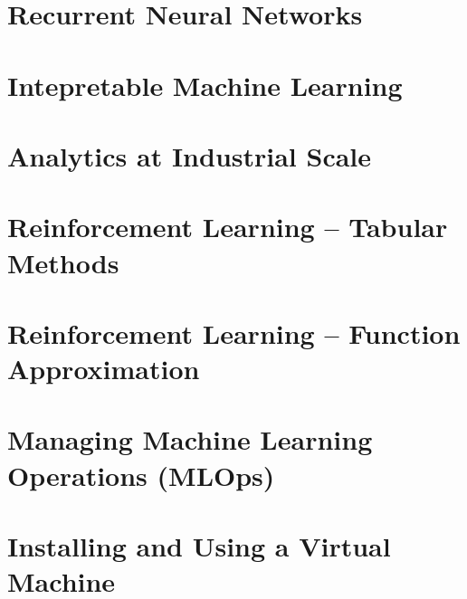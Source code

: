 \documentclass{book}
\begin{document}
\graphicspath{{class17/}}
\chapter{Recurrent Neural Networks}


\graphicspath{{class19/}}
\chapter{Intepretable Machine Learning}


\graphicspath{{class20/}}
\chapter{Analytics at Industrial Scale}


\graphicspath{{class21/}}
\chapter{Reinforcement Learning -- Tabular Methods}


\graphicspath{{class22/}}
\chapter{Reinforcement Learning -- Function Approximation}


\graphicspath{{class23/}}
\chapter{Managing Machine Learning Operations (MLOps)}


%

\appendix
\graphicspath{{vm/}}
\chapter{Installing and Using a Virtual Machine}


%
\end{document}
